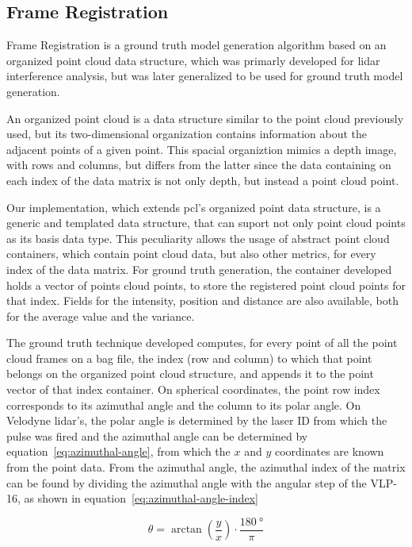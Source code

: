 \subsection{Frame Registration}
\label{subsec:lidar-interference:frame-registration}
Frame Registration is a ground truth model generation algorithm based on an organized point cloud data structure, which was primarly developed for \ac{lidar} interference analysis, but was later generalized to be used for ground truth model generation.

An organized point cloud is a data structure similar to the point cloud previously used, but its two-dimensional organization contains information about the adjacent points of a given point. This spacial organiztion mimics a depth image, with rows and columns, but differs from the latter since the data containing on each index of the data matrix is not only depth, but instead a point cloud point.

Our implementation, which extends \ac{pcl}'s organized point data structure, is a generic and templated data structure, that can suport not only point cloud points as its basis data type. This peculiarity allows the usage of abstract point cloud containers, which contain point cloud data, but also other metrics, for every index of the data matrix. For ground truth generation, the container developed holds a vector of points cloud points, to store the registered point cloud points for that index. Fields for the intensity, position and distance are also available, both for the average value and the variance.

The ground truth technique developed computes, for every point of all the point cloud frames on a bag file, the index (row and column) to which that point belongs on the organized point cloud structure, and appends it to the point vector of that index container. On spherical coordinates, the point row index corresponds to its azimuthal angle and the column to its polar angle. On Velodyne \ac{lidar}'s, the polar angle is determined by the laser ID from which the pulse was fired and the azimuthal angle can be determined by equation~\ref{eq:azimuthal-angle}, from which the $x$ and $y$ coordinates are known from the point data. From the azimuthal angle, the azimuthal index of the matrix can be found by dividing the azimuthal angle with the angular step of the VLP-16, as shown in equation~\ref{eq:azimuthal-angle-index}

\begin{equation}
	\label{eq:azimuthal-angle}
	\theta = \arctan\left(\frac{y}{x}\right) \cdot \frac{\SI{180}{\degree}}{\pi}
\end{equation}

